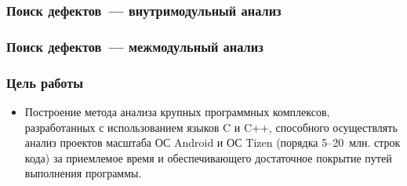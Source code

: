 \documentclass[14pt]{beamer}
\begin{document}
\begin{frame}
\frametitle{Поиск дефектов~--- внутримодульный анализ}
\begin{figure}[h]
\end{figure}
\end{frame}

\begin{frame}
\frametitle{Поиск дефектов~--- межмодульный анализ}
\begin{figure}[h]
\end{figure}
\end{frame}


\begin{frame}
\frametitle{Цель работы}
\begin{itemize}
  \item Построение метода анализа крупных программных комплексов, разработанных с использованием языков C и C++, способного осуществлять анализ проектов масштаба ОС Android и ОС Tizen (порядка 5--20~млн. строк кода) за приемлемое время и обеспечивающего достаточное покрытие путей выполнения программы.
\end{itemize}
\end{frame}
\end{document}
